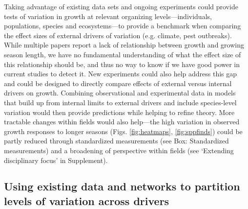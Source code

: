 \documentclass[11pt]{article}
\begin{document}
Taking advantage of existing data sets and ongoing experiments could provide tests of variation in growth at relevant organizing levels---individuals, populations, species and ecosystems---to provide a benchmark when comparing the effect sizes of external drivers of variation (e.g. climate, pest outbreaks). While multiple papers report a lack of relationship between growth and growing season length, we have no fundamental understanding of what the effect size of this relationship should be, and thus no way to know if we have good power in current studies to detect it. New experiments could also help address this gap and could be designed to directly compare effects of external versus internal drivers on growth. Combining observational and experimental data in models that build up from internal limits to external drivers and include species-level variation would then provide predictions while helping to refine theory. More tractable changes within fields would also help---the high variation in observed growth responses to longer seasons (Figs. \ref{fig:heatmaps}, \ref{fig:sppfinds}) could be partly reduced through standardized measurements (see Box: Standardized measurements) and a broadening of perspective within fields (see `Extending disciplinary focus' in Supplement). 


\subsection*{Using existing data and networks to partition levels of variation across drivers}
\end{document}
